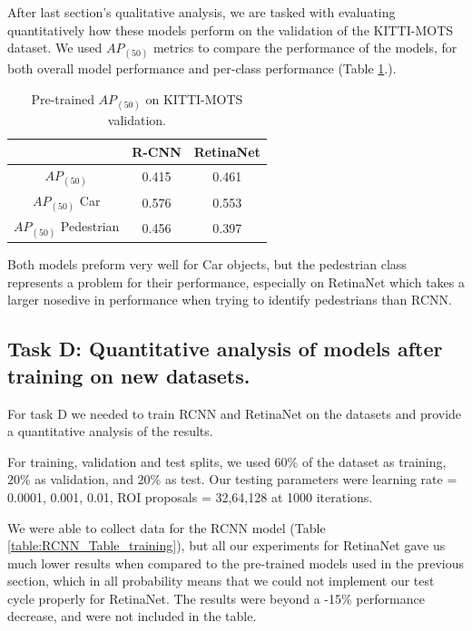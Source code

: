 \documentclass[12pt,a4paper,twocolumn,twoside]{article}
\begin{document}
After last section's qualitative analysis, we are tasked with evaluating
quantitatively how these models perform on the validation of the KITTI-MOTS dataset. We used 
$AP_{(50)}$ metrics to compare the performance of the models, for both 
overall model performance and per-class performance (Table \ref{table:KITTI_Table1}.). 

\begin{table}[ht]
    \centering
    \begin{tabular}{|c || c | c|} 
        \hline
          & \textbf{R-CNN} & \textbf{RetinaNet} \\ [0.8ex] 
          \hline
         $AP_{(50)}$ & 0.415 & 0.461  \\ 
         \hline
         $AP_{(50)}$ Car & 0.576 & 0.553 \\
         \hline
         $AP_{(50)}$ Pedestrian & 0.456 & 0.397 \\
         \hline
    \end{tabular}
    \caption{\label{table:KITTI_Table1}Pre-trained $AP_{(50)}$ on KITTI-MOTS validation.}
\end{table}

Both models preform very well for Car objects, but the pedestrian class
represents a problem for their performance, especially on RetinaNet
which takes a larger nosedive in performance when trying to identify pedestrians
than RCNN.

\subsection{Task D: Quantitative analysis of models after training on new datasets.}

For task D we needed to train RCNN and RetinaNet on the datasets and provide
a quantitative analysis of the results. 

For training, validation and test splits, we used $60\%$ of the dataset as training, $20\%$
as validation, and $20\%$ as test. 
Our testing parameters were learning rate = {0.0001, 0.001, 0.01}, 
ROI proposals = {32,64,128} at 1000 iterations.

We were able to collect data for the RCNN model 
(Table \ref{table:RCNN_Table_training}), but 
all our experiments for RetinaNet gave us much lower results when compared to the pre-trained
models used in the previous section, which in all probability means that we could not
implement our test cycle properly for RetinaNet. The results were beyond a -15\% performance
decrease, and were not included in the table. 
\end{document}
